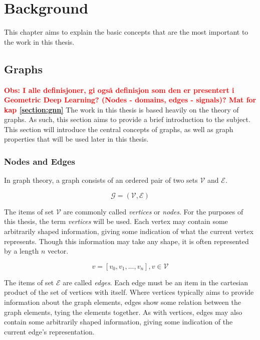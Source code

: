 \chapter{Background}

This chapter aims to explain the basic concepts that are the most important to the work in this thesis.



\section{Graphs}
\textcolor{red}{\textbf{Obs: I alle definisjoner, gi også definisjon som den er presentert i Geometric Deep Learning? (Nodes - domains, edges - signals)? Mat for kap \ref{section:gnn}}}
The work in this thesis is based heavily on the theory of graphs. 
As such, this section aims to provide a brief introduction to the subject.
This section will introduce the central concepts of graphs, 
as well as graph properties that will be used later in this thesis.


\subsection{Nodes and Edges}

In graph theory, a graph consists of an ordered pair of two sets $ \mathcal{V} $ and $ \mathcal{E} $.

$$ \mathcal{G} = (\mathcal{V}, {\mathcal{E}}) $$

The items of set $ \mathcal{V} $ are commonly called \textit{vertices} or \textit{nodes}. 
For the purposes of this thesis, the term \textit{vertices} will be used.
Each vertex may contain some arbitrarily shaped information, giving some indication of what the current vertex represents.
Though this information may take any shape, it is often represented by a length $ n $ vector.

$$ v = [v_0, v_1, ..., v_n], v \in \mathcal{V} $$

The items of set $ \mathcal{E} $ are called \textit{edges}. 
Each edge must be an item in the cartesian product of the set of vertices with itself.
Where vertices typically aims to provide information about the graph elements, 
edges show some relation between the graph elements, tying the elements together.
As with vertices, edges may also contain some arbitrarily shaped information, 
giving some indication of the current edge's representation.

